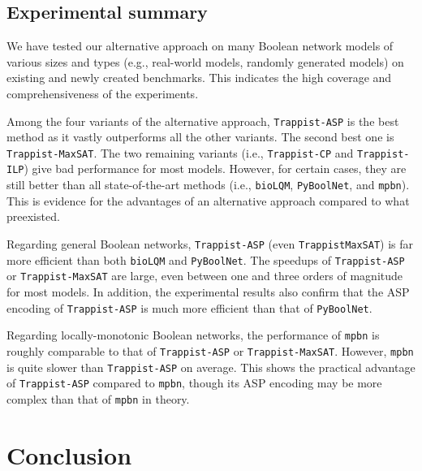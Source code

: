 \documentclass[preprint,12pt]{elsarticle}
\begin{document}
\subsection{Experimental summary}
\label{subsec:Experimental_summary}

We have tested our alternative approach on many Boolean network models of various sizes and types (e.g., real-world models, randomly generated models) on existing and newly created benchmarks.
This indicates the high coverage and comprehensiveness of the experiments.

Among the four variants of the alternative approach, \texttt{Trappist-ASP} is the best method as it vastly outperforms all the other variants.
The second best one is \texttt{Trappist-MaxSAT}.
The two remaining variants (i.e., \texttt{Trappist-CP} and \texttt{Trappist-ILP}) give bad performance for most models.
However, for certain cases, they are still better than all state-of-the-art methods (i.e., \texttt{bioLQM}, \texttt{PyBoolNet}, and \texttt{mpbn}).
This is evidence for the advantages of an alternative approach compared to what preexisted.

Regarding general Boolean networks, \texttt{Trappist-ASP} (even \texttt{Trappist\-MaxSAT}) is far more efficient than both \texttt{bioLQM} and \texttt{PyBoolNet}.
The speedups of \texttt{Trappist-ASP} or \texttt{Trappist-MaxSAT} are large, even between one and three orders of magnitude for most models.
In addition, the experimental results also confirm that the ASP encoding of \texttt{Trappist-ASP} is much more efficient than that of \texttt{PyBoolNet}.

Regarding locally-monotonic Boolean networks, the performance of \texttt{mpbn} is roughly comparable to that of \texttt{Trappist-ASP} or \texttt{Trappist-MaxSAT}.
However, \texttt{mpbn} is quite slower than \texttt{Trappist-ASP} on average.
This shows the practical advantage of \texttt{Trappist-ASP} compared to \texttt{mpbn}, though its ASP encoding may be more complex than that of \texttt{mpbn} in theory.


\section{Conclusion}%
\label{sec:Conclusion}
\end{document}

